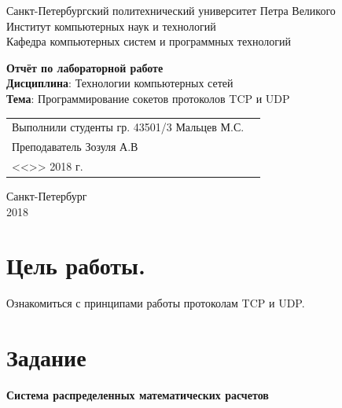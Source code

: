 \documentclass[a4paper,14pt]{extarticle}
\begin{document}
\begin{titlepage}
\centering
Санкт-Петербургский политехнический университет Петра Великого \\
Институт компьютерных наук и технологий \\
Кафедра компьютерных систем и программных технологий \\
\vspace{5.5cm}

{\centering \textbf{Отчёт по лабораторной работе} \\ 
\vspace{0.15cm}
\textbf{Дисциплина}: Технологии компьютерных сетей \\
\vspace{0.15cm}
\textbf{Тема}: Программирование сокетов протоколов TCP и UDP } \\

\vspace{5.5cm}

\begin{table}[H]
\begin{tabular}{p{\textwidth}@{}r}
{Выполнили студенты гр. 43501/3} \hfill 
\vspace{0.2cm}
Мальцев М.С. \\ \hfill
\vspace{0.2cm}

Преподаватель \hfill 
\vspace{0.2cm}
Зозуля А.В \\ \hfill 
\vspace{0.2cm}

{} \hfill { <<\underline{\hspace{0.08\textwidth}}>> \underline{\hspace{0.2\textwidth}}2018 г.} \\
\end{tabular}
\end{table}
\vfill
{\centering Санкт-Петербург \\ 
\vspace{0.15cm}
2018}
\end{titlepage}

\section{Цель работы.}
Ознакомиться с принципами работы протоколам TCP и UDP.

\section{Задание}
\textbf{Система распределенных математических расчетов}
\end{document}
